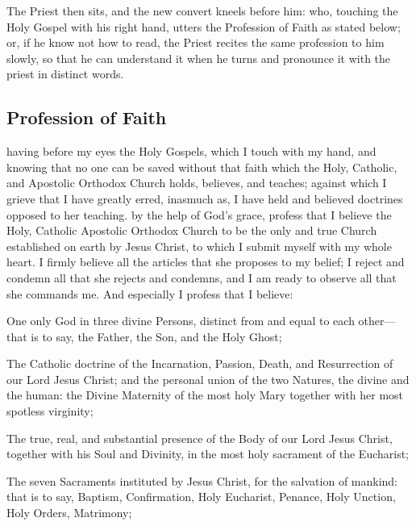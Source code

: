 
\clearpage
\begin{rubric}
    The Priest then sits, and the new convert kneels before him: who, touching the Holy Gospel with his right hand, utters the Profession of Faith as stated below; or, if he know not how to read, the Priest recites the same profession to him slowly, so that he can understand it when he turns and pronounce it with the priest in distinct words.
\end{rubric}
\subsection{Profession of Faith}
 having before my eyes the Holy Gospels, which I touch with my hand, and knowing that no one can be saved without that faith which the Holy, Catholic, and Apostolic 
Orthodox Church holds, believes, and teaches; against which I grieve that I have greatly erred, inasmuch as, I have held and believed doctrines opposed to her teaching.
 by the help of God’s grace, profess that I believe the Holy, Catholic Apostolic 
Orthodox Church to be the only and true Church established on earth by Jesus Christ, to which I submit myself with my whole heart. I firmly believe all the articles that she proposes to my belief; I reject and condemn all that she rejects and condemns, and I am ready to observe all that she commands me. And especially I profess that I believe:

One only God in three divine Persons, distinct from and equal to each other---that is to say, the Father, the Son, and the Holy Ghost;

The Catholic doctrine of the Incarnation, Passion, Death, and Resurrection of our Lord Jesus Christ; and the personal union of the two Natures, the divine and the human: the Divine Maternity of the most holy Mary together with her most spotless virginity; %

The true, real, and substantial presence of the Body of our Lord Jesus Christ, together with his Soul and Divinity, in the most holy sacrament of the Eucharist;

The seven Sacraments instituted by Jesus Christ, for the salvation of mankind: that is to say, Baptism, Confirmation, Holy Eucharist, Penance, 
Holy Unction, Holy Orders, Matrimony;

